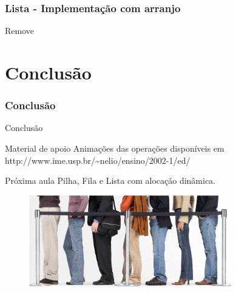\documentclass[aspectratio=169]{beamer}
\begin{document}

\begin{frame}
\frametitle{Lista - Implementação com arranjo}
\begin{algorithm}[H]
\caption{Remove} 
\label{Remove}
\end{algorithm}
\end{frame}
\section{Conclusão}
\begin{frame}
\frametitle{Conclusão}
Conclusão
\begin{block} {Material de apoio}
 Animações das operações disponíveis em http://www.ime.usp.br/\~{ }nelio/ensino/2002-1/ed/
\end{block}
\begin{block} {Próxima aula}
 Pilha, Fila e Lista com alocação dinâmica.
\end{block}
\end{frame}



%
%

\begin{frame}
\titlepage %

\begin{figure}[!h]
  \centering
  \includegraphics[width=250pt]{imgs/introducao.jpg}
  \label{fig_introducao}
\end{figure}
\end{frame}


\end{document}

